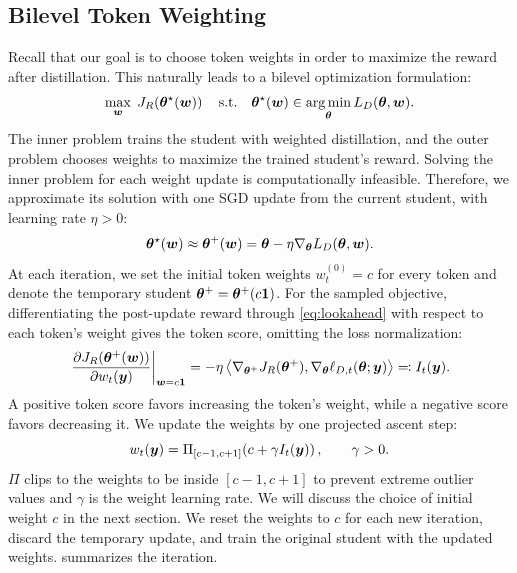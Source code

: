 \documentclass{article} %
\begin{document}
\subsection{Bilevel Token Weighting}\label{sec:bilevel}
Recall that our goal is to choose token weights in order to maximize the reward after distillation. This naturally leads 
to a bilevel optimization formulation:
\begin{equation}
    \max_{\bm{w}}\;J_R\!\left(\bm{\theta}^\star(\bm{w})\right)
    \quad\text{s.t.}\quad
    \bm{\theta}^\star(\bm{w})\in\operatorname*{arg\,min}_{\bm{\theta}}L_D(\bm{\theta},\bm{w}).
    \label{eq:bilevel}
\end{equation}
The inner problem trains the student with weighted distillation, and the
outer problem chooses weights to maximize the trained student's reward.
Solving the inner problem for each weight update is computationally
infeasible. Therefore, we approximate its solution with one SGD \citep{robbins1951stochastic} update from the current
student, with learning rate \(\eta>0\):
\begin{equation}
    \bm{\theta}^\star(\bm{w})\approx\bm{\theta}^+(\bm{w})
    =\bm{\theta}-\eta\nabla_{\bm{\theta}}L_D(\bm{\theta},\bm{w}).
    \label{eq:lookahead}
\end{equation}
At each iteration, we set the initial token weights \(w_t^{(0)}=c\) for every token and 
denote the temporary student
\(\bm{\theta}^+=\bm{\theta}^+(c\mathbf 1)\).
For the sampled objective, differentiating the post-update reward through
\cref{eq:lookahead} with respect to each token's weight gives the token score,
omitting the loss normalization:
\begin{equation}
    \left.\frac{\partial J_R(\bm{\theta}^+(\bm{w}))}{\partial w_t(\bm{y})}
    \right|_{\bm{w}=c\mathbf 1}
    =-\eta\left\langle
        \nabla_{\bm{\theta}^+}J_R(\bm{\theta}^+),
        \nabla_{\bm{\theta}}\ell_{D,t}(\bm{\theta};\bm{y})
    \right\rangle
    \eqqcolon I_t(\bm{y}).
    \label{eq:token-score}
\end{equation}
A positive token score favors increasing the token's weight, while a negative score
favors decreasing it. We update the weights by one projected ascent step:
\begin{equation}
    w_t(\bm{y})
    =\Pi_{[c-1,c+1]}\!\left(c+\gamma I_t(\bm{y})\right),
    \qquad \gamma>0.
    \label{eq:projected-weight-update}
\end{equation}
\(\Pi\) clips to the weights to be inside \([c-1,c+1]\) to prevent extreme outlier values 
and \(\gamma\) is the weight learning rate.
We will discuss the choice of initial weight \(c\) in the next section.
We reset the weights to \(c\) for
each new iteration, discard the temporary update, and train the original student
with the updated weights.  summarizes the iteration.
\end{document}
